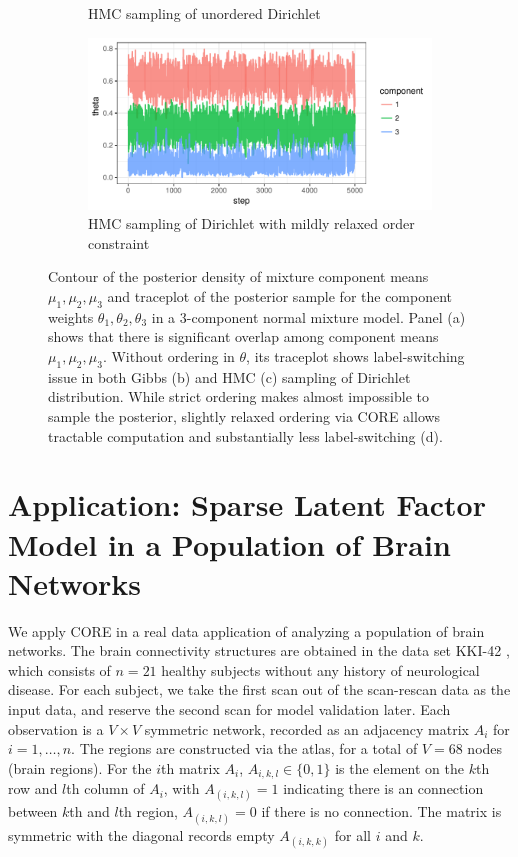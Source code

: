 \documentclass[10pt,fleqn]{article}
\DeclareMathOperator{\1}{\mathbbm{1}} \DeclareMathOperator{\bigO}{\mc O}
\begin{document}
\begin{figure}[H]
\begin{subfigure}[b]{0.32\textwidth}
\caption{\small  HMC sampling of unordered Dirichlet}
\end{subfigure}
\begin{subfigure}[b]{0.32\textwidth}
\includegraphics[width=1\textwidth]{fmm_w_hmc.pdf}
\caption{\small  HMC sampling of Dirichlet with mildly relaxed order constraint}
\end{subfigure}
\caption{Contour of the posterior density of mixture component means $\mu_1,\mu_2,\mu_3$ and traceplot of
  the posterior sample for the component weights $\theta_1,\theta_2,\theta_3$ in a 3-component normal
  mixture model. Panel (a) shows that there is significant overlap among
  component means $\mu_1,\mu_2,\mu_3$. Without ordering in $\theta$, its
  traceplot shows label-switching issue in both Gibbs (b) and HMC  (c) sampling
  of Dirichlet distribution. While strict ordering makes almost impossible to
  sample the posterior, slightly relaxed ordering via CORE allows tractable computation
  and substantially less label-switching (d).}
\label{dirichlet}
\end{figure}


\section{Application: Sparse Latent Factor Model in a Population of Brain Networks}

We apply CORE in a real data application of analyzing a population of brain
networks. The brain connectivity structures are obtained in the data set KKI-42
\citep{landman2011multi}, which consists of $n=21$ healthy subjects without any
history of neurological disease. For each subject, we take the first scan out of
the scan-rescan data as the input data, and reserve the second scan for model
validation later. Each observation is a $V\times V$ symmetric network, recorded
as an adjacency matrix $A_i$ for $i=1,\ldots,n$. The regions are constructed via
the \cite{desikan2006automated} atlas, for a total of $V = 68$ nodes (brain
regions). For the $i$th matrix $A_i$, $A_{i,k,l} \in \{0,1\}$ is the element on
the $k$th row and $l$th column of $A_i$, with $A_{(i,k,l)}=1$ indicating there
is an connection between $k$th and $l$th region, $A_{(i,k,l)}=0$ if there is no
connection. The matrix is symmetric with the diagonal records empty
$A_{(i,k,k)}$ for all $i$ and $k$.
\end{document}
